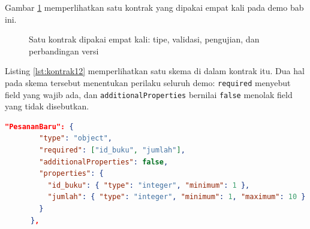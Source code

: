 Gambar \ref{fig:kontrak} memperlihatkan satu kontrak yang dipakai empat kali
pada demo bab ini.

\begin{figure}[!htb]
  \centering
  \caption{Satu kontrak dipakai empat kali: tipe, validasi, pengujian, dan
           perbandingan versi}
  \label{fig:kontrak}
\end{figure}

Listing \ref{lst:kontrak12} memperlihatkan satu skema di dalam kontrak itu.
Dua hal pada skema tersebut menentukan perilaku seluruh demo:
\texttt{required} menyebut field yang wajib ada, dan
\texttt{additionalProperties} bernilai \texttt{false} menolak field yang
tidak disebutkan.

\begin{lstlisting}[language=json, caption={Satu skema di dalam kontrak, tersedia di \berkas{sources/chapter12/kontrak.json}}, label={lst:kontrak12}]
      "PesananBaru": {
        "type": "object",
        "required": ["id_buku", "jumlah"],
        "additionalProperties": false,
        "properties": {
          "id_buku": { "type": "integer", "minimum": 1 },
          "jumlah": { "type": "integer", "minimum": 1, "maximum": 10 }
        }
      },
\end{lstlisting}

